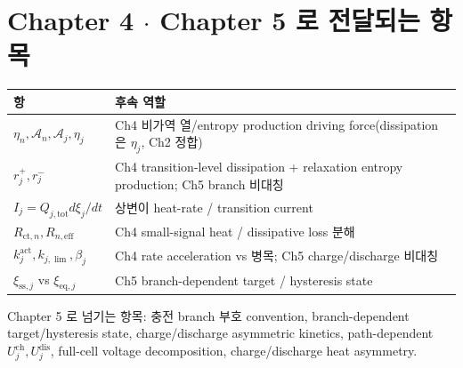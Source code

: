 \documentclass[11pt,a4paper]{article}
\newcommand{\eff}{\mathrm{eff}}
\newcommand{\eq}{\mathrm{eq}}
\newcommand{\tot}{\mathrm{tot}}
\newcommand{\ct}{\mathrm{ct}}
\newcommand{\sstat}{\mathrm{ss}}
\begin{document}
\section{Chapter 4 $\cdot$ Chapter 5 로 전달되는 항목}\label{sec:ch3_transmit}
\begin{longtable}{p{} p{}}
\toprule 항 & 후속 역할 \\ \midrule \endhead
$\eta_n,\mathcal A_n,\mathcal A_j,\eta_j$ & Ch4 비가역 열/entropy production driving force(dissipation 은 $\eta_j$, Ch2 정합) \\
$r_j^+,r_j^-$ & Ch4 transition-level dissipation + relaxation entropy production; Ch5 branch 비대칭 \\
$I_j=Q_{j,\tot}d\xi_j/dt$ & 상변이 heat-rate / transition current \\
$R_{\ct,n},R_{n,\eff}$ & Ch4 small-signal heat / dissipative loss 분해 \\
$k_j^{\mathrm{act}},k_{j,\lim},\beta_j$ & Ch4 rate acceleration vs 병목; Ch5 charge/discharge 비대칭 \\
$\xi_{\sstat,j}$ vs $\xi_{\eq,j}$ & Ch5 branch-dependent target / hysteresis state \\
\bottomrule
\end{longtable}
Chapter 5 로 넘기는 항목: 충전 branch 부호 convention, branch-dependent target/hysteresis state,
charge/discharge asymmetric kinetics, path-dependent $U_j^{\mathrm{ch}},U_j^{\mathrm{dis}}$, full-cell
voltage decomposition, charge/discharge heat asymmetry.

\end{document}
